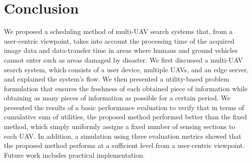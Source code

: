 \documentclass{ieeeaccess}
\begin{document}
\section{Conclusion}
We proposed a scheduling method of multi-UAV search systems that, from a user-centric viewpoint, takes into account the processing time of the acquired image data and data-transfer time in areas where humans and ground vehicles cannot enter such as areas damaged by disaster. We first discussed a multi-UAV search system, which consists of a user device, multiple UAVs, and an edge server, and explained the system's flow. We then presented a utility-based problem formulation that ensures the freshness of each obtained piece of information while obtaining as many pieces of information as possible for a certain period. We presented the results of a basic performance evaluation to verify that in terms of cumulative sum of utilities, the proposed method performed better than the fixed method, which simply uniformly assigns a fixed number of sensing sections to each UAV. In addition, a simulation using three evaluation metrics showed that the proposed method performs at a sufficient level from a user-centric viewpoint. Future work includes practical implementation.

\appendices
\end{document}
